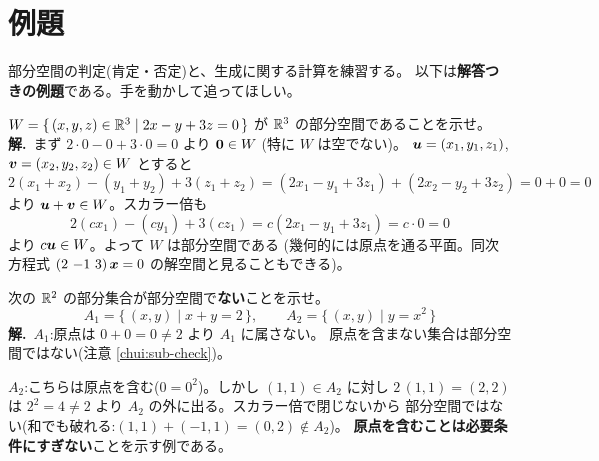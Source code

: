 \section{例題}

部分空間の判定(肯定・否定)と、生成に関する計算を練習する。
以下は\textbf{解答つきの例題}である。手を動かして追ってほしい。

\begin{rei}[例題・基本(部分空間であることの証明)]\label{rei:sub-plane}
$W = \{\, (x, y, z) \in \mathbb{R}^3 \mid 2x - y + 3z = 0 \,\}$ が
$\mathbb{R}^3$ の部分空間であることを示せ。\\
\textbf{解.}\ まず $2 \cdot 0 - 0 + 3 \cdot 0 = 0$ より $\bm{0} \in W$
(特に $W$ は空でない)。
$\bm{u} = (x_1, y_1, z_1)$, $\bm{v} = (x_2, y_2, z_2) \in W$ とすると
\[
2(x_1 + x_2) - (y_1 + y_2) + 3(z_1 + z_2)
= (2x_1 - y_1 + 3z_1) + (2x_2 - y_2 + 3z_2) = 0 + 0 = 0
\]
より $\bm{u} + \bm{v} \in W$。スカラー倍も
\[
2(cx_1) - (cy_1) + 3(cz_1) = c(2x_1 - y_1 + 3z_1) = c \cdot 0 = 0
\]
より $c\bm{u} \in W$。よって $W$ は部分空間である
(幾何的には原点を通る平面。同次方程式
$(2\ {-1}\ 3)\,\bm{x} = 0$ の解空間と見ることもできる)。
\end{rei}

\begin{rei}[例題・基本(部分空間でないことの証明)]\label{rei:sub-curve}
次の $\mathbb{R}^2$ の部分集合が部分空間で\textbf{ない}ことを示せ。
\[
A_1 = \{\, (x, y) \mid x + y = 2 \,\}, \qquad
A_2 = \{\, (x, y) \mid y = x^2 \,\}
\]
\textbf{解.}\ $A_1$:原点は $0 + 0 = 0 \neq 2$ より $A_1$ に属さない。
原点を含まない集合は部分空間ではない(注意 \ref{chui:sub-check})。

$A_2$:こちらは原点を含む($0 = 0^2$)。しかし
$(1, 1) \in A_2$ に対し $2\,(1, 1) = (2, 2)$ は
$2^2 = 4 \neq 2$ より $A_2$ の外に出る。スカラー倍で閉じないから
部分空間ではない(和でも破れる:$(1,1) + (-1,1) = (0, 2) \notin A_2$)。
\textbf{原点を含むことは必要条件にすぎない}ことを示す例である。
\end{rei}

